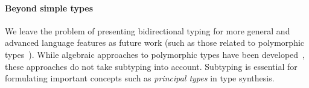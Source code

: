 \paragraph{Beyond simple types}
We leave the problem of presenting bidirectional typing for more general and advanced language features as future work (such as those related to polymorphic types~\citep{Pierce2000,Peyton-Jones2007,Dunfield2013,Xie2018}).
While algebraic approaches to polymorphic types have been developed~\citep{Fiore2013,Hamana2011}, these approaches do not take subtyping into account.
Subtyping is essential for formulating important concepts such as \emph{principal types} in type synthesis.

%
%
%
%
%
